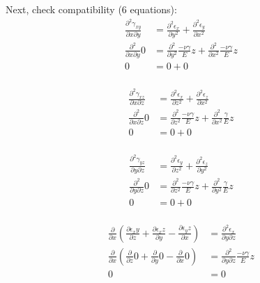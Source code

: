 Next, check compatibility (6 equations):
\[
\begin{aligned}
    \frac{\partial^2 \gamma_{xy}}{\partial x \partial y} &= \frac{\partial^2 \epsilon_x}{\partial y^2} + \frac{\partial^2 \epsilon_y}{\partial x^2} \\
    \frac{\partial^2}{\partial x \partial y} 0 &= \frac{\partial^2}{\partial y^2} \frac{-\nu\gamma}{E} z + \frac{\partial^2}{\partial x^2} \frac{-\nu\gamma}{E} z \\
    0 &= 0 + 0 \\
\end{aligned}
\]

\[
\begin{aligned}
    \frac{\partial^2 \gamma_{xz}}{\partial x \partial z} &= \frac{\partial^2 \epsilon_x}{\partial z^2} + \frac{\partial^2 \epsilon_z}{\partial x^2} \\
    \frac{\partial^2}{\partial x \partial z} 0 &= \frac{\partial^2}{\partial z^2} \frac{-\nu\gamma}{E} z + \frac{\partial^2}{\partial x^2} \frac{\gamma}{E} z \\
    0 &= 0 + 0 \\
\end{aligned}
\]  

\[
\begin{aligned}
    \frac{\partial^2 \gamma_{yz}}{\partial y \partial z} &= \frac{\partial^2 \epsilon_y}{\partial z^2} + \frac{\partial^2 \epsilon_z}{\partial y^2} \\
    \frac{\partial^2}{\partial y \partial z} 0 &= \frac{\partial^2}{\partial z^2} \frac{-\nu\gamma}{E} z + \frac{\partial^2}{\partial y^2} \frac{\gamma}{E} z \\
    0 &= 0 + 0 \\
\end{aligned}
\]

\[
\begin{aligned}
    \frac{\partial}{\partial x} \left(\frac{\partial \epsilon_xy}{\partial z}  + \frac{\partial \epsilon_xz}{\partial y} - 
    \frac{\partial \epsilon_yz}{\partial x}\right) &= \frac{\partial^2 \epsilon_x}{\partial y \partial z}\\
    \frac{\partial}{\partial x} \left(\frac{\partial}{\partial z} 0  + \frac{\partial}{\partial y} 0 - 
    \frac{\partial}{\partial x} 0\right) &= \frac{\partial^2}{\partial y \partial z} \frac{-\nu\gamma}{E} z \\
    0 &= 0 \\
\end{aligned}
\]

